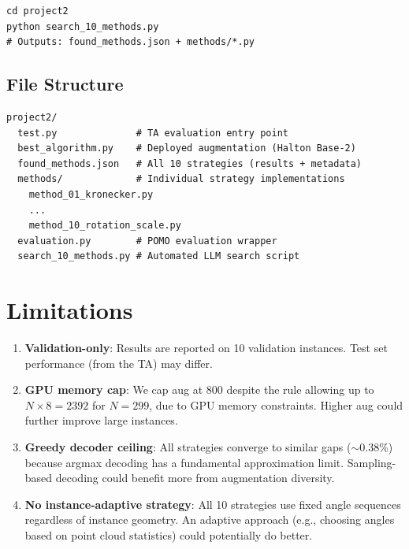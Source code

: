 \documentclass[11pt,a4paper]{article}
\begin{document}
\begin{lstlisting}
cd project2
python search_10_methods.py
# Outputs: found_methods.json + methods/*.py
\end{lstlisting}

\subsection{File Structure}

\begin{lstlisting}[language={}]
project2/
  test.py              # TA evaluation entry point
  best_algorithm.py    # Deployed augmentation (Halton Base-2)
  found_methods.json   # All 10 strategies (results + metadata)
  methods/             # Individual strategy implementations
    method_01_kronecker.py
    ...
    method_10_rotation_scale.py
  evaluation.py        # POMO evaluation wrapper
  search_10_methods.py # Automated LLM search script
\end{lstlisting}

\section{Limitations}
\label{sec:limit}

\begin{enumerate}
  \item \textbf{Validation-only}: Results are reported on 10 validation
        instances. Test set performance (from the TA) may differ.
  \item \textbf{GPU memory cap}: We cap aug at 800 despite the rule allowing
        up to $N \times 8 = 2392$ for $N=299$, due to GPU memory constraints.
        Higher aug could further improve large instances.
  \item \textbf{Greedy decoder ceiling}: All strategies converge to similar
        gaps ($\sim$0.38\%) because argmax decoding has a fundamental
        approximation limit. Sampling-based decoding could benefit more from
        augmentation diversity.
  \item \textbf{No instance-adaptive strategy}: All 10 strategies use fixed
        angle sequences regardless of instance geometry. An adaptive approach
        (e.g., choosing angles based on point cloud statistics) could
        potentially do better.
\end{enumerate}

\end{document}
